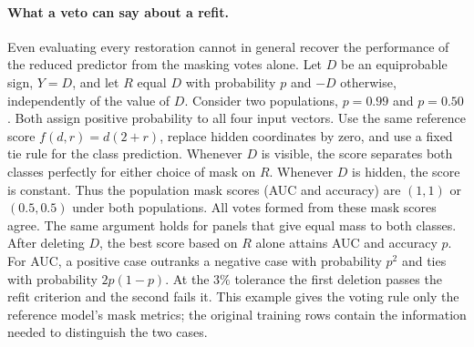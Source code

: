 \paragraph{What a veto can say about a refit.}
Even evaluating every restoration cannot in general recover the performance
of the reduced predictor from the masking votes alone. Let $D$ be an
equiprobable sign, $Y=D$, and let $R$ equal $D$ with probability $p$ and
$-D$ otherwise, independently of the value of $D$. Consider two populations,
$p=0.99$ and $p=0.50$. Both assign positive probability to all four input
vectors. Use the same reference score $f(d,r)=d(2+r)$, replace hidden
coordinates by zero, and use a fixed tie rule for the class prediction.
Whenever $D$ is visible, the score separates both classes perfectly for either
choice of mask on $R$. Whenever $D$ is hidden, the score is constant.
Thus the population mask scores (AUC and accuracy) are $(1,1)$ or
$(0.5,0.5)$ under both populations. All votes formed from these mask scores
agree. The same argument holds for panels that give equal mass to both classes.
After deleting $D$, the best score based on $R$ alone attains AUC and accuracy
$p$. For AUC, a positive case outranks a negative case with probability
$p^2$ and ties with probability $2p(1-p)$. At the $3\%$ tolerance the first
deletion passes the refit criterion and the second fails it. This example
gives the voting rule only the reference model's mask metrics; the original
training rows contain the information needed to distinguish the two cases.
